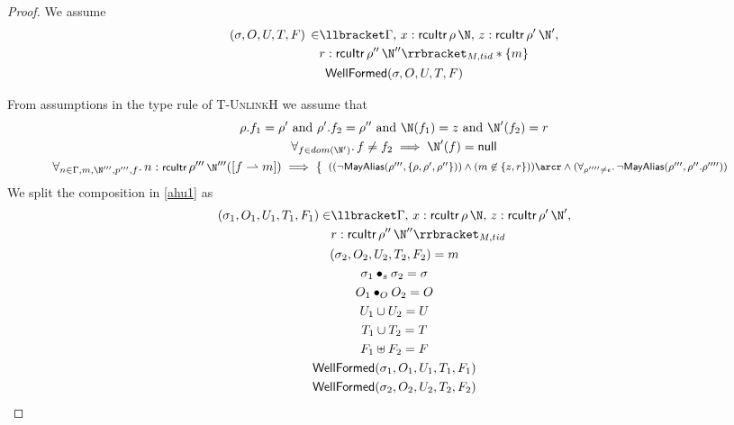  \begin{proof}
We assume
\begin{gather}\label{ahu1}
  \begin{aligned}
    (\sigma, O, U, T, F) \, \in &  \llbracket \Gamma, \, x:\mathsf{rcuItr}\,\rho\,\N ,\, z:\mathsf{rcuItr} \, \rho' \,\N', \\
    &r:\mathsf{rcuItr} \, \rho'' \,\N'' \rrbracket_{M,tid} * \{m\}
    \end{aligned} \\
\textsf{WellFormed}(\sigma,O,U,T,F)
\label{ahu2}
\end{gather}

From assumptions in the type rule of \textsc{T-UnlinkH} we assume that
\begin{gather}
  \rho.f_1=\rho' \text{ and } \rho'.f_2=\rho'' \text{ and } \N(f_1) = z \text{ and } \N'(f_2)=r
    \label{ahu4} \\
\forall_{f\in dom(\N')} \ldotp f\neq f_2 \implies  \N'(f) = \textsf{null}
      \label{ahu5} \\
\begin{array}{l}\footnotesize
\forall_{n\in \Gamma,m,\N''', p''',f}\ldotp n:\textsf{rcuItr}\,\rho'''\,\N'''([f\rightharpoonup m]) \implies %
\left\{\begin{array}{l}
((\neg\mathsf{MayAlias}(\rho''',\{\rho,\rho',\rho''\})  ) \land (m\not\in\{z,r\} ) ) \arcr
\land (\forall_{\rho''''\neq \epsilon} \ldotp \neg\mathsf{MayAlias}(\rho''', \rho''.\rho'''') )
\end{array}\right.
\end{array}
        \label{ahu6}
\end{gather}
We split the composition in  \ref{ahu1} as 
\begin{gather} \label{ahu11}
  \begin{aligned}
    (\sigma_1, O_{1}, U_{1}, T_{1},F_1 ) \in  &\llbracket \Gamma, \, x:\mathsf{rcuItr}\,\rho\,\N ,\, z:\mathsf{rcuItr} \, \rho' \,\N',\\
    &r:\mathsf{rcuItr} \, \rho'' \,\N'' \rrbracket_{M,tid} \end{aligned}\\
\label{ahu12}
(\sigma_2, O_{2}, U_{2}, T_{2},F_2) = m
\\
\label{ahusig}
\sigma_1 \bullet_s \sigma_2 = \sigma \\
\label{ahu13}
O_{1} \bullet_{O} O_{2} = O
\\
\label{ahu14}
U_{1} \cup U_{2} = U
\\
\label{ahu15}
T_{1} \cup T_{2} = T
\\
\label{ahff}
F_{1} \uplus F_2 = F
\\
\label{ahu16}
\textsf{WellFormed}(\sigma_1,O_{1},U_{1},T_{1},F_1)
\\
\label{ahu17}
\textsf{WellFormed}(\sigma_2,O_{2},U_{2},T_{2},F_2)
\end{gather}


\end{proof}
